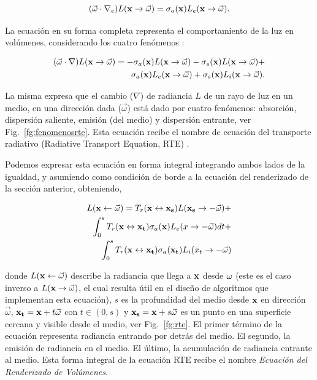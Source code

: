 $$ (\vec{\omega} \cdot \nabla_{e}) L(\bold{x} \rightarrow \vec{\omega}) = \sigma_{a}(\bold{x}) L_{e}(\bold{x} \rightarrow \vec{\omega}).$$

La ecuación en su forma completa representa el comportamiento de la luz en volúmenes, considerando los cuatro fenómenos \cite{Jarosz2008}:

\begin{equation}
\begin{aligned}
(\vec{\omega} \cdot \nabla) L(\bold{x} \rightarrow \vec{\omega}) = - \sigma_{a}(\bold{x}) L(\bold{x} \rightarrow \vec{\omega}) - \sigma_{s}(\bold{x}) L(\bold{x} \rightarrow \vec{\omega}) + \\
\sigma_{a}(\bold{x}) L_{e}(\bold{x} \rightarrow \vec{\omega}) + \sigma_{s}(\bold{x}) L_{i}(\bold{x} \rightarrow \vec{\omega}).
\end{aligned}
\end{equation}

La misma expresa que el cambio ($\nabla$) de radiancia $L$ de un rayo de luz en un medio, en una dirección dada ($\vec{\omega}$) está dado por cuatro fenómenos: absorción, dispersión saliente, emisión (del medio) y dispersión entrante, ver Fig.~\ref{fg:fenomenosrte}.
Esta ecuación recibe el nombre de ecuación del transporte radiativo (Radiative Transport Equation, \acrshort{RTE}) \cite{Chandrasekhar1960}.

Podemos expresar esta ecuación en forma integral integrando ambos lados de la igualdad, y asumiendo como condición de borde a la ecuación del renderizado de la sección anterior, obteniendo,

\begin{equation}
\begin{aligned}
L(\bold{x} \leftarrow \vec{\omega}) = T_{r}(\bold{x} \leftrightarrow \bold{x_{s}}) L(\bold{x_{s}} \rightarrow -\vec{\omega}) + \\
\int_{0}^{s}{T_{r}(\bold{x} \leftrightarrow \bold{x_{t}}) \sigma_{a}(\bold{x}) L_{e}(x \rightarrow -\vec{\omega}) dt } + \\
\int_{0}^{s}{T_{r}(\bold{x} \leftrightarrow \bold{x_{t}}) \sigma_{a}(\bold{x_{t}}) L_{i}(x_{t} \rightarrow -\vec{\omega})  }
\end{aligned}
\label{eq:rteintegral}
\end{equation}

donde $L(\bold{x} \leftarrow \vec{\omega})$ describe la radiancia que llega a $\bold{x}$ desde $\bold{\omega}$ (este es el caso inverso a $L(\bold{x} \rightarrow {\vec{\omega}})$, el cual resulta útil en el diseño de algoritmos que implementan esta ecuación), $s$ es la profundidad del medio desde $\bold{x}$ en dirección $\vec{\omega}$, $\bold{x_{t}} = \bold{x} + t\vec{\omega}$ con $t \in (0,s)$ y $\bold{x_{s}} = \bold{x}+ s\vec{\omega}$ es un punto en una superficie cercana y visible desde el medio, ver Fig.~\ref{fg:rte}.
El primer término de la ecuación representa radiancia entrando por detrás del medio.
El segundo, la emisión de radiancia en el medio.
El último, la acumulación de radiancia entrante al medio. 
Esta forma integral de la ecuación RTE recibe el nombre {\em Ecuación del Renderizado de Volúmenes}.

